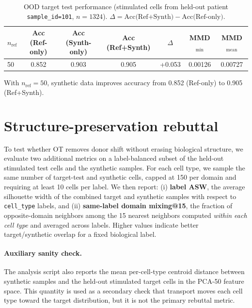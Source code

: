 \begin{table}[t]
  \centering
  \begin{tabular}{lcccccc}
    \toprule
    $n_{\text{ref}}$ &
    Acc (Ref-only) &
    Acc (Synth-only) &
    Acc (Ref+Synth) &
    $\Delta$ &
    MMD$_{\min}$ &
    MMD$_{\text{mean}}$ \\
    \midrule
    50 & 0.852 & 0.903 & 0.905 & +0.053 & 0.00126 & 0.00727 \\
    \bottomrule
  \end{tabular}
  \caption{OOD target test performance (stimulated cells from held-out patient \texttt{sample\_id=101}, $n=1324$). $\Delta=\text{Acc(Ref+Synth)}-\text{Acc(Ref-only)}$.}
  \label{tab:kang-ref50-tuned}
\end{table}

With $n_{\text{ref}}=50$, synthetic data improves accuracy from 0.852 (Ref-only) to 0.905 (Ref+Synth).

\section{Structure-preservation rebuttal}
To test whether OT removes donor shift without erasing biological structure, we evaluate two additional
metrics on a label-balanced subset of the held-out stimulated test cells and the synthetic samples.
For each cell type, we sample the same number of target-test and synthetic cells, capped at 150 per
domain and requiring at least 10 cells per label.
We then report:
(i) \textbf{label ASW}, the average silhouette width of the combined target and synthetic samples
with respect to \texttt{cell\_type} labels, and
(ii) \textbf{same-label domain mixing@15}, the fraction of opposite-domain neighbors among the
15 nearest neighbors computed \emph{within each cell type} and averaged across labels.
Higher values indicate better target/synthetic overlap for a fixed biological label.

\paragraph{Auxiliary sanity check.}
The analysis script also reports the mean per-cell-type centroid distance between synthetic samples
and the held-out stimulated target cells in the PCA-50 feature space.
This quantity is used as a secondary check that transport moves each cell type toward the target
distribution, but it is not the primary rebuttal metric.

